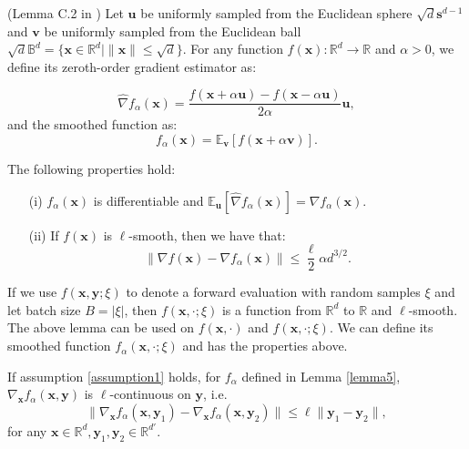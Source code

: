 \begin{lemma}
\label{lemma5}
    (Lemma C.2 in \cite{zhang2024dpzero})
        Let \( { \mathbf{u}} \) be uniformly sampled from the Euclidean sphere \( \sqrt{d}\mathbb{{ \mathbf{s}}}^{d-1} \) and \( { \mathbf{v}} \) be uniformly sampled from the Euclidean ball \( \sqrt{d}\mathbb{B}^d = \{ { \mathbf{x}} \in \mathbb{R}^d \mid \|{ \mathbf{x}}\| \leq \sqrt{d} \} \). For any function \( f({ \mathbf{x}}) : \mathbb{R}^d \to \mathbb{R} \) and \( \alpha > 0 \), we define its zeroth-order gradient estimator as:

\[
\hat{\nabla} f_\alpha({ \mathbf{x}}) = \frac{f({ \mathbf{x}} + \alpha { \mathbf{u}}) - f({ \mathbf{x}} - \alpha { \mathbf{u}})}{2 \alpha} { \mathbf{u}},
\]
and the smoothed function as:
\[
f_\alpha({ \mathbf{x}}) = \mathbb{E}_{ \mathbf{v}}[f({ \mathbf{x}} + \alpha { \mathbf{v}})].
\]

The following properties hold:

\begin{itemize}
    \item[(i)] \( f_\alpha({ \mathbf{x}}) \) is differentiable and \( \mathbb{E}_{ \mathbf{u}}[\hat{\nabla} f_\alpha({ \mathbf{x}})] = \nabla f_\alpha({ \mathbf{x}}) \).
    
    \item[(ii)] If \( f({ \mathbf{x}}) \) is \(\ell\)-smooth, then we have that:
    \[
    \|\nabla f({ \mathbf{x}}) - \nabla f_\alpha({ \mathbf{x}})\| \leq \frac{\ell}{2} \alpha d^{3/2}.
    \]
\end{itemize}
\end{lemma}

If we use $f({ \mathbf{x}},{ \mathbf{y}};\xi)$ to denote a forward evaluation with random samples $\xi$ and let batch size $B=|\xi|$, then $f({ \mathbf{x}},\cdot;\xi)$ is a function from $\mathbb{R}^d$ to $\mathbb{R}$ and $\ell$-smooth. The above lemma can be used on $f({ \mathbf{x}},\cdot)$ and $f({ \mathbf{x}},\cdot;\xi)$. We can define its smoothed function $f_\alpha({ \mathbf{x}},\cdot;\xi)$ and has the properties above.

\begin{lemma}
\label{lemma6}
    If assumption \ref{assumption1} holds, for $f_\alpha$ defined in Lemma \ref{lemma5}, $\nabla_{ \mathbf{x}} f_\alpha({ \mathbf{x}},{ \mathbf{y}})$ is $\ell$-continuous on ${ \mathbf{y}}$, i.e.
    $$\|\nabla_{ \mathbf{x}} f_\alpha({ \mathbf{x}},{ \mathbf{y}}_1)-\nabla_{ \mathbf{x}} f_\alpha({ \mathbf{x}},{ \mathbf{y}}_2)\|\leq \ell \|{ \mathbf{y}}_1-{ \mathbf{y}}_2\|,$$
    for any ${ \mathbf{x}}\in\mathbb{R}^d,{ \mathbf{y}}_1,{ \mathbf{y}}_2\in\mathbb{R}^{d'}$.
\end{lemma}


